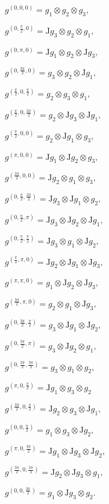 \documentclass[fleqn,a4paper,oneside,openany]{book}
\begin{document}
$g^{(0,0,0)}= g_{1}\otimes g_{2}\otimes g_{3},$

$g^{(0,\frac{\pi}{2},0)}= \mathrm{J}g_{3}\otimes g_{2}\otimes g_{1},$

$g^{(0,\pi,0)}= \mathrm{J}g_{1}\otimes g_{2}\otimes \mathrm{J}g_{3},$

$g^{(0,\frac{3\pi}{2},0)}= g_{3}\otimes g_{2}\otimes \mathrm{J}g_{1},$

$g^{(\frac{\pi}{2},0,\frac{\pi}{2})}= g_{2}\otimes g_{3}\otimes g_{1},$

$g^{(\frac{\pi}{2},0,\frac{3\pi}{2})}= g_{2}\otimes \mathrm{J}g_{3}\otimes \mathrm{J}g_{1},$

$g^{(\frac{\pi}{2},0,0)}= g_{2}\otimes \mathrm{J}g_{1}\otimes g_{3},$

$g^{(\pi,0,0)}= \mathrm{J}g_{1} \otimes \mathrm{J}g_{2}\otimes g_{3},$

$g^{(\frac{3\pi}{2},0,0)}= \mathrm{J}g_{2}\otimes g_{1}\otimes g_{3},$

$g^{(0,\frac{\pi}{2},\frac{3\pi}{2})}= \mathrm{J}g_{3}\otimes \mathrm{J}g_{1}\otimes g_{2},$

$g^{(0,\frac{\pi}{2},\pi)}= \mathrm{J}g_{3}\otimes \mathrm{J}g_{2}\otimes \mathrm{J}g_{1},$

$g^{(0,\frac{\pi}{2},\frac{\pi}{2})}= \mathrm{J}g_{3}\otimes g_{1}\otimes \mathrm{J}g_{2},$

$g^{(\frac{\pi}{2},\pi,0)}= \mathrm{J}g_{2}\otimes \mathrm{J}g_{1}\otimes \mathrm{J}g_{3},$

$g^{(\pi,\pi,0)}= g_{1}\otimes \mathrm{J}g_{2}\otimes \mathrm{J}g_{3},$

$g^{(\frac{3\pi}{2},\pi,0)}= g_{2}\otimes g_{1}\otimes \mathrm{J}g_{3},$

$g^{(0,\frac{3\pi}{2},\frac{\pi}{2})}= g_{3}\otimes \mathrm{J}g_{1}\otimes \mathrm{J}g_{2},$

$g^{(0,\frac{3\pi}{2},\pi)}= g_{3}\otimes \mathrm{J}g_{2}\otimes g_{1},$

$g^{(0,\frac{3\pi}{2},\frac{3\pi}{2})}= g_{3}\otimes g_{1}\otimes g_{2},$

$g^{(\pi,0,\frac{\pi}{2})}= \mathrm{J}g_{1}\otimes g_{3}\otimes g_{2}$

$g^{(\frac{3\pi}{2},0,\frac{\pi}{2})}= \mathrm{J}g_{2}\otimes g_{3}\otimes \mathrm{J}g_{1},$

$g^{(0,0,\frac{\pi}{2})}= g_{1}\otimes g_{3}\otimes \mathrm{J}g_{2},$

$g^{(\pi,0,\frac{3\pi}{2})}= \mathrm{J}g_{1}\otimes \mathrm{J}g_{3}\otimes \mathrm{J}g_{2},$

$g^{(\frac{3\pi}{2},0,\frac{3\pi}{2})}= \mathrm{J}g_{2}\otimes \mathrm{J}g_{3}\otimes g_{1},$

$g^{(0,0,\frac{3\pi}{2})}= g_{1}\otimes \mathrm{J}g_{3}\otimes g_{2}.$
\end{document}
